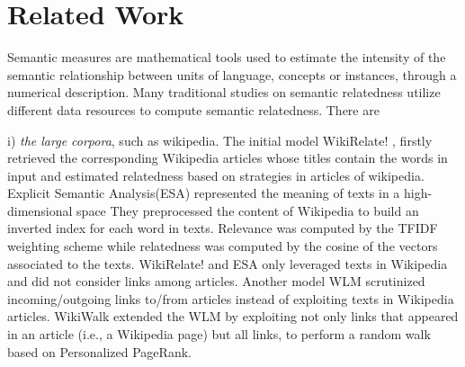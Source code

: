 \section{Related Work}
\label{related-work}
Semantic measures are mathematical tools used to estimate the intensity of the 
semantic relationship between units of language, concepts or instances, through 
a numerical description. Many traditional studies on semantic relatedness utilize
different data resources to compute semantic relatedness. There are

i) \emph{the large corpora}, such as wikipedia. 
The initial model WikiRelate! \cite{aaai/StrubeP06}, firstly retrieved the corresponding Wikipedia
articles whose titles contain the words in input and estimated relatedness based on strategies in articles of wikipedia.
Explicit Semantic Analysis(ESA)\cite{ijcai/GabrilovichM07} represented the meaning of texts in a high-dimensional space
They preprocessed the content of Wikipedia to build an inverted index for each word in texts.
Relevance was computed by the TFIDF weighting scheme while relatedness was computed by
the cosine of the vectors associated to the texts. WikiRelate! and ESA only leveraged texts in
Wikipedia and did not consider links among articles. Another model WLM \cite{aaai/Milne08} scrutinized incoming/outgoing
links to/from articles instead of exploiting texts in Wikipedia articles.
WikiWalk \cite{textgraphs/YehRMAS09} extended the WLM by exploiting not only links that appeared in an article
(i.e., a Wikipedia page) but all links, to perform a random walk based on Personalized PageRank.


